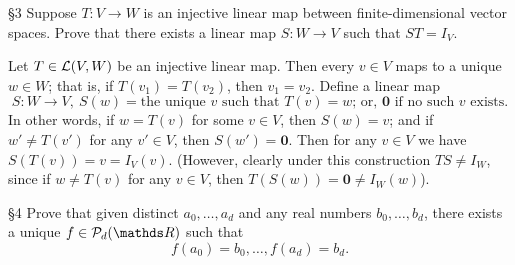 \documentclass{homework}
\begin{document}
\begin{problem}{\S 3}
  Suppose $T:V\to W$ is an injective linear map between finite-dimensional vector spaces. Prove that
  there exists a linear map $S:W\to V$ such that $ST=I_V$.
\end{problem}


\begin{solution}
  Let $T\in \mathcal{L}(V,W)$ be an injective linear map. Then every $v\in V$ maps to a unique $w\in W$;
  that is, if $T(v_1)=T(v_2)$, then $v_1=v_2$. Define a linear map \[
    S: W\longrightarrow V,\ S(w)=\text{the unique $v$ such that $T(v)=w$; or, $\textbf{0}$ if no
    such $v$ exists}
  .\] In other words, if $w=T(v)$ for some $v\in V$, then $S(w)=v$; and if $w'\neq T(v')$ for any
  $v'\in V$, then $S(w')=\textbf{0}$. Then for any $v\in V$ we have $S(T(v))=v=I_V(v)$.
  (However, clearly under this construction $TS\neq I_W$, since if $w\neq T(v)$ for any $v\in V$,
  then $T(S(w))=\textbf{0}\neq I_W(w)$).
\end{solution}

\begin{problem}{\S 4}
  Prove that given distinct $a_0,\ldots,a_d$ and any real numbers $b_0,\ldots,b_d$, there exists a
  unique $f\in \mc{P}_d(\R)$ such that \[
    f(a_0)=b_0,\ldots,f(a_d)=b_d
  .\] 
\end{problem}
\end{document}
